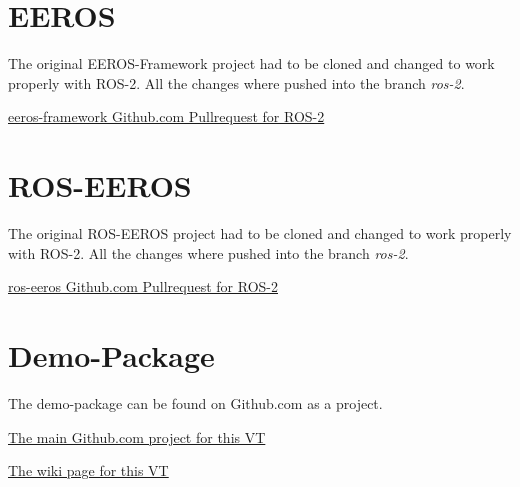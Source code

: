 

\section*{EEROS} \label{app:eeros}

The original EEROS-Framework project had to be cloned and changed to work properly with ROS-2. All the changes where pushed into the branch \textit{ros-2}.

\href{https://github.com/LukyLuke/eeros-framework/tree/ros-2}{eeros-framework Github.com Pullrequest for ROS-2}



\section*{ROS-EEROS} \label{app:ros-eeros}

The original ROS-EEROS project had to be cloned and changed to work properly with ROS-2. All the changes where pushed into the branch \textit{ros-2}.

\href{https://github.com/LukyLuke/ros-eeros/tree/ros-2}{ros-eeros Github.com Pullrequest for ROS-2}


\section*{Demo-Package} \label{app:demo-package}

The demo-package can be found on Github.com as a project.

\href{https://github.com/LukyLuke/mse_vt_eeros}{The main Github.com project for this VT}

\href{https://github.com/LukyLuke/mse_vt_eeros/wiki}{The wiki page for this VT}


